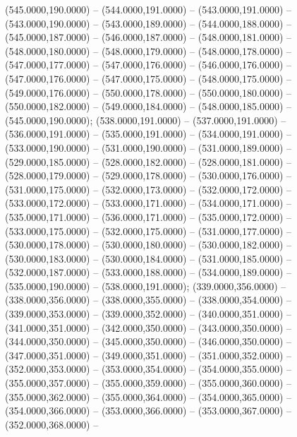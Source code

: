 
\begin{scope}[draw=black,fill=cd7191c,line join=round,line width=0.208pt]
   (545.0000,190.0000) -- (544.0000,191.0000) --
    (543.0000,191.0000) -- (543.0000,190.0000) -- (543.0000,189.0000) --
    (544.0000,188.0000) -- (545.0000,187.0000) -- (546.0000,187.0000) --
    (548.0000,181.0000) -- (548.0000,180.0000) -- (548.0000,179.0000) --
    (548.0000,178.0000) -- (547.0000,177.0000) -- (547.0000,176.0000) --
    (546.0000,176.0000) -- (547.0000,176.0000) -- (547.0000,175.0000) --
    (548.0000,175.0000) -- (549.0000,176.0000) -- (550.0000,178.0000) --
    (550.0000,180.0000) -- (550.0000,182.0000) -- (549.0000,184.0000) --
    (548.0000,185.0000) -- (545.0000,190.0000);
   (538.0000,191.0000) -- (537.0000,191.0000) --
    (536.0000,191.0000) -- (535.0000,191.0000) -- (534.0000,191.0000) --
    (533.0000,190.0000) -- (531.0000,190.0000) -- (531.0000,189.0000) --
    (529.0000,185.0000) -- (528.0000,182.0000) -- (528.0000,181.0000) --
    (528.0000,179.0000) -- (529.0000,178.0000) -- (530.0000,176.0000) --
    (531.0000,175.0000) -- (532.0000,173.0000) -- (532.0000,172.0000) --
    (533.0000,172.0000) -- (533.0000,171.0000) -- (534.0000,171.0000) --
    (535.0000,171.0000) -- (536.0000,171.0000) -- (535.0000,172.0000) --
    (533.0000,175.0000) -- (532.0000,175.0000) -- (531.0000,177.0000) --
    (530.0000,178.0000) -- (530.0000,180.0000) -- (530.0000,182.0000) --
    (530.0000,183.0000) -- (530.0000,184.0000) -- (531.0000,185.0000) --
    (532.0000,187.0000) -- (533.0000,188.0000) -- (534.0000,189.0000) --
    (535.0000,190.0000) -- (538.0000,191.0000);
   (339.0000,356.0000) -- (338.0000,356.0000) --
    (338.0000,355.0000) -- (338.0000,354.0000) -- (339.0000,353.0000) --
    (339.0000,352.0000) -- (340.0000,351.0000) -- (341.0000,351.0000) --
    (342.0000,350.0000) -- (343.0000,350.0000) -- (344.0000,350.0000) --
    (345.0000,350.0000) -- (346.0000,350.0000) -- (347.0000,351.0000) --
    (349.0000,351.0000) -- (351.0000,352.0000) -- (352.0000,353.0000) --
    (353.0000,354.0000) -- (354.0000,355.0000) -- (355.0000,357.0000) --
    (355.0000,359.0000) -- (355.0000,360.0000) -- (355.0000,362.0000) --
    (355.0000,364.0000) -- (354.0000,365.0000) -- (354.0000,366.0000) --
    (353.0000,366.0000) -- (353.0000,367.0000) -- (352.0000,368.0000) --

\end{scope}
